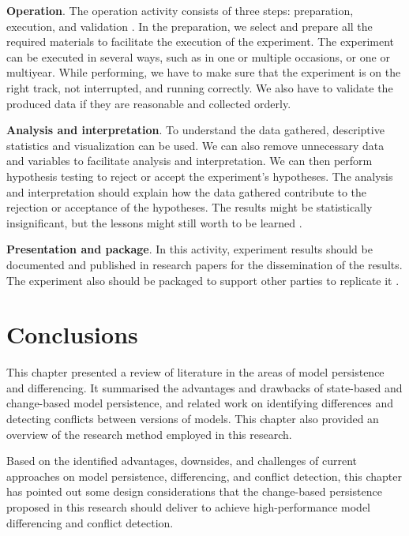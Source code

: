 \textbf{Operation}. The operation activity consists of three steps: preparation, execution, and validation \cite{DBLP:books/daglib/0029933/Wohlin}. 
In the preparation, we select and prepare all the required materials to facilitate the execution of the experiment. The experiment can be executed in several ways, such as in one or multiple occasions, or one or multiyear.  While performing, we have to make sure that the experiment is on the right track, not interrupted, and running correctly. We also have to validate the produced data if they are reasonable and collected orderly.

\textbf{Analysis and interpretation}.
To understand the data gathered, descriptive statistics and visualization can be used. We can also remove unnecessary data and variables to facilitate analysis and interpretation. We can then perform hypothesis testing to reject or accept the experiment's hypotheses. The analysis and interpretation should explain how the data gathered contribute to the rejection or acceptance of the hypotheses. The results might be statistically insignificant, but the lessons might still worth to be learned \cite{DBLP:books/daglib/0029933/Wohlin}. 

\textbf{Presentation and package}. In this activity, experiment results should be documented and published in research papers for the dissemination of the results. The experiment also should be packaged to support other parties to replicate it \cite{DBLP:books/daglib/0029933/Wohlin}. 

\section{Conclusions}
\label{sec:conclusions_2}
This chapter presented a review of literature in the areas of model persistence and differencing. It summarised the advantages and drawbacks of state-based and change-based model persistence, and related work on identifying differences and detecting conflicts between versions of models. This chapter also provided an overview of the research method employed in this research. 

Based on the identified advantages, downsides, and challenges of current approaches on model persistence, differencing, and conflict detection, this chapter has pointed out some design considerations that the change-based persistence proposed in this research should deliver to achieve high-performance model differencing and conflict detection.
